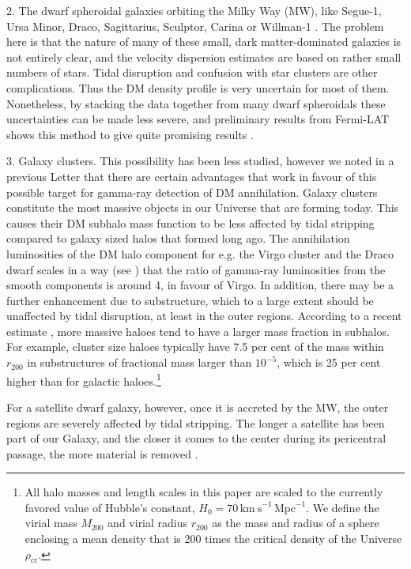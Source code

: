 \documentclass[10pt,aps,pra,reprint,amsmath,amsfonts,amssymb,showpacs,nofootinbib,floatfix]{revtex4-1}
\newcommand{\rmn}{\mathrm}
\newcommand{\rvir}{r_{200}}
\newcommand{\mvir}{M_{200}}
\begin{document}
2. The dwarf spheroidal galaxies orbiting the Milky Way (MW), like
Segue-1, Ursa Minor, Draco, Sagittarius, Sculptor, Carina or Willman-1
\cite{2009JCAP...01..016B,2010ApJ...720.1174A,2010JCAP...01..031S,2010JCAP...01..031S}. The
problem here is that the nature of many of these small, dark
matter-dominated galaxies is not entirely clear, and the velocity
dispersion estimates are based on rather small numbers of stars. Tidal
disruption and confusion with star clusters are other
complications. Thus the DM density profile is very uncertain for most
of them. Nonetheless, by stacking the data together from many dwarf
spheroidals these uncertainties can be made less severe, and
preliminary results from Fermi-LAT shows this method to give quite
promising results \cite{garde}.

3. Galaxy clusters. This possibility has been less studied, however we
noted in a previous Letter \cite{2009PhRvL.103r1302P} that there are
certain advantages that work in favour of this possible target for
gamma-ray detection of DM annihilation.  Galaxy clusters constitute
the most massive objects in our Universe that are forming today. This
causes their DM subhalo mass function to be less affected by tidal
stripping compared to galaxy sized halos that formed long ago.  The
annihilation luminosities of the DM halo component for e.g. the Virgo
cluster and the Draco dwarf scales in a way (see
\cite{2009PhRvL.103r1302P}) that the ratio of gamma-ray luminosities
from the smooth components is around 4, in favour of Virgo. In
addition, there may be a further enhancement due to substructure,
which to a large extent should be unaffected by tidal disruption, at
least in the outer regions.  According to a recent estimate
\cite{2011MNRAS.410.2309G}, more massive haloes tend to have a larger
mass fraction in subhalos.  For example, cluster size haloes typically
have 7.5 per cent of the mass within $r_{200}$ in substructures of
fractional mass larger than $10^{-5}$, which is 25 per cent higher
than for galactic haloes.\footnote{All halo masses and length scales in
  this paper are scaled to the currently favored value of Hubble's
  constant, $H_0 = 70\, \rmn{km~s}^{-1}\,\rmn{Mpc}^{-1}$. We define
  the virial mass $\mvir$ and virial radius $\rvir$ as the mass and
  radius of a sphere enclosing a mean density that is 200 times the
  critical density of the Universe $\rho_{\rmn{cr}}$.}

For a satellite dwarf galaxy, however, once it is accreted by the MW,
the outer regions are severely affected by tidal stripping. The longer
a satellite has been part of our Galaxy, and the closer it comes to
the center during its pericentral passage, the more material is
removed \cite{2004MNRAS.355..819G}.
\end{document}
